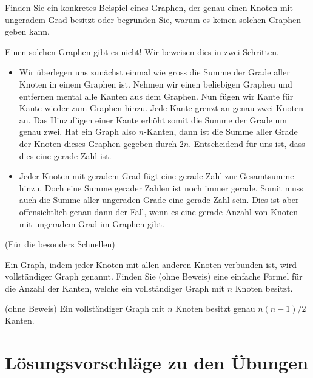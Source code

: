 \begin{myexercise}\label{aufgabe:09}
Finden Sie ein konkretes Beispiel eines Graphen, der genau einen Knoten mit ungeradem Grad besitzt oder begründen Sie, warum es keinen solchen Graphen geben kann.
\begin{myanswer}\label{aufgabe:09-sol}
Einen solchen Graphen gibt es nicht! Wir beweisen dies in zwei Schritten.
\begin{itemize}
    \item Wir überlegen uns zunächst einmal wie gross die Summe der Grade aller Knoten in einem Graphen ist. Nehmen wir einen beliebigen Graphen und entfernen mental alle Kanten aus dem Graphen. Nun fügen wir Kante für Kante wieder zum Graphen hinzu. Jede Kante grenzt an genau zwei Knoten an. Das Hinzufügen einer Kante erhöht somit die Summe der Grade um genau zwei. Hat ein Graph also $n$-Kanten, dann ist die Summe aller Grade der Knoten dieses Graphen gegeben durch $2n$. Entscheidend für uns ist, dass dies eine gerade Zahl ist.
    \item Jeder Knoten mit geradem Grad fügt eine gerade Zahl zur Gesamtsumme hinzu. Doch eine Summe gerader Zahlen ist noch immer gerade. Somit muss auch die Summe aller ungeraden Grade eine gerade Zahl sein. Dies ist aber offensichtlich genau dann der Fall, wenn es eine gerade Anzahl von Knoten mit ungeradem Grad im Graphen gibt.
\end{itemize}
\end{myanswer}
\end{myexercise}

\begin{myexercise}\label{aufgabe:10}
(Für die besonders Schnellen)

\noindent
Ein Graph, indem jeder Knoten mit allen anderen Knoten verbunden ist, wird vollständiger Graph genannt. Finden Sie (ohne Beweis) eine einfache Formel für die Anzahl der Kanten, welche ein vollständiger Graph mit $n$ Knoten besitzt.
\begin{myanswer}\label{aufgabe:10-sol}
(ohne Beweis) Ein vollständiger Graph mit $n$ Knoten besitzt genau $n(n-1)/2$ Kanten.
\end{myanswer}
\end{myexercise}
\newpage
\section{Lösungsvorschläge zu den Übungen}
\shipoutanswers